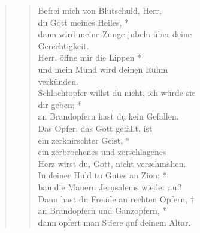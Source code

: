 \begin{quote}
\begin{verse}
Befrei mich von Blutschuld, Herr,\\ du Gott meines Heiles, *\\
dann wird meine Zunge jubeln über d\d eine \\Gerechtigkeit.\\
\vin Herr, öffne mir die Lippen *\\
\vin und mein Mund wird dein\d en Ruhm \\ \vin verkünden.\\
Schlachtopfer willst du nicht, ich würde sie\\ dir geben; *\\
an Brandopfern hast d\d u kein Gefallen. \\
\vin Das Opfer, das Gott gefällt, ist \\ \vin ein zerknirschter Geist, *\\
\vin ein zerbrochenes und zerschlagenes\\ \vin  Herz wirst du, G\d ott, nicht verschmähen.\\ 
In deiner Huld tu Gutes an Zion; *\\
bau die Mauern Jer\d usalems wieder auf! \\
\vin Dann hast du Freude an rechten Opfern, †\\
\vin an Brandopfern und Ganzopfern, *\\ \vin dann opfert man Stiere \d auf deinem Altar. \\

\end{verse}
\end{quote}


\vspace{0.cm}
\def\greinitialformat#1{{\fontsize{40}{40}\selectfont #1}}
\gresetfirstlineaboveinitial{\small \textcolor{red}{Ps 92}}{}
\setaboveinitialseparation{0.72mm}

\vspace{0.3cm}


